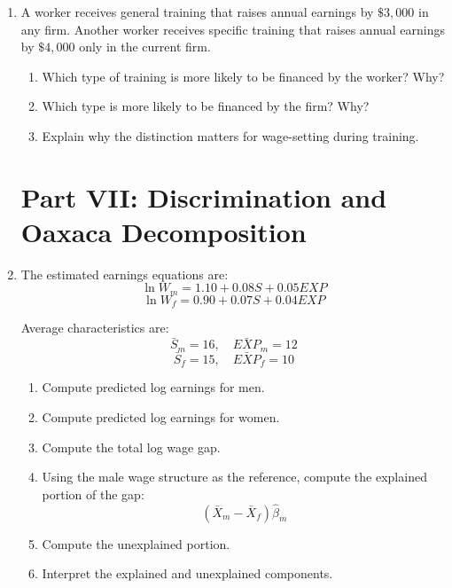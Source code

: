 \documentclass[12pt]{article}
\begin{document}
\begin{enumerate}
Use the annuity formula:
\[
PV = A\left(\frac{1-(1+r)^{-T}}{r}\right).
\]

\begin{enumerate}[label=(\alph*)]
    \item Compute the total annual cost of education.
    \item Compute the present value of the 3 years of education costs, assuming they are paid at the end of each year.
    \item Compute the annual earnings gain from the diploma.
    \item Compute the present value of the benefits at the time of graduation.
    \item Discount the benefits back to the present.
    \item Should Johny invest in the diploma? Use the NPV rule.
\end{enumerate}

\item A worker receives general training that raises annual earnings by \(\$3{,}000\) in any firm. Another worker receives specific training that raises annual earnings by \(\$4{,}000\) only in the current firm.

\begin{enumerate}[label=(\alph*)]
    \item Which type of training is more likely to be financed by the worker? Why?
    \item Which type is more likely to be financed by the firm? Why?
    \item Explain why the distinction matters for wage-setting during training.
\end{enumerate}

\section*{Part VII: Discrimination and Oaxaca Decomposition}

\item The estimated earnings equations are:
\[
\ln W_m = 1.10 + 0.08S + 0.05EXP
\]
\[
\ln W_f = 0.90 + 0.07S + 0.04EXP
\]

Average characteristics are:
\[
\bar S_m = 16,\quad \bar{EXP}_m = 12
\]
\[
\bar S_f = 15,\quad \bar{EXP}_f = 10
\]

\begin{enumerate}[label=(\alph*)]
    \item Compute predicted log earnings for men.
    \item Compute predicted log earnings for women.
    \item Compute the total log wage gap.
    \item Using the male wage structure as the reference, compute the explained portion of the gap:
    \[
    (\bar X_m - \bar X_f)\hat\beta_m
    \]
    \item Compute the unexplained portion.
    \item Interpret the explained and unexplained components.
\end{enumerate}


\end{enumerate}
\end{document}
